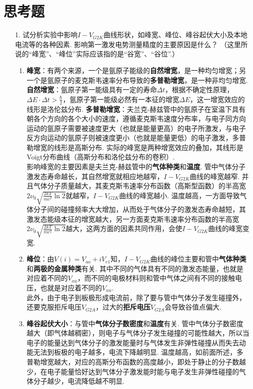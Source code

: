 \documentclass[UTF8,10pt,a4paper]{article}
\begin{document}
\section{思考题}
\begin{enumerate}
    \item[1.] 试分析实验中影响$I-V_{G2K}$曲线形状，如峰宽、峰位、峰谷起伏大小及本地电流等的各种因素. 影响第一激发电势测量精度的主要原因是什么？
    （这里所说的“峰宽”、“峰位”实际应该指的是“谷宽”、“谷位”.）
    \begin{enumerate}
        \item \textbf{峰宽}：有两个来源，一个是氩原子能级的\textbf{自然增宽}，是一种均匀增宽；另一个是氩原子的麦克斯韦速率分布导致的\textbf{多普勒增宽}，是一种非均匀增宽. \textbf{自然增宽}：氩原子第一能级具有一定的寿命$\Delta t$，根据不确定性原理，$\Delta E\cdot\Delta t>\frac{\hbar}{2}$，氩原子第一能级必然有一本征的增宽$\Delta E$，这一增宽效应的线形是洛伦兹分布. \textbf{多普勒增宽}：夫兰克-赫兹管中的氩原子在室温下具有朝各个方向的各个大小的速度，遵循麦克斯韦速度分布率，与电子同方向运动的氩原子需要被速度更大（也就是能量更高）的电子所激发，与电子反方向运动的氩原子则被速度更小（也就是能量更低）的电子激发，多普勒增宽的线形是高斯分布. 实际的峰宽是两种增宽效应的叠加，其线形是Voigt分布曲线（高斯分布和洛伦兹分布的卷积）.\\
        影响峰宽的主要因素是夫兰克-赫兹管中的\textbf{气体种类}和\textbf{温度}. 管中气体分子激发态寿命越长，其自然增宽就相应地越窄，$I-V_{G2K}$曲线的峰宽越窄. 并且气体分子质量越大，其麦克斯韦速率分布函数（高斯型函数）的半高宽$2\nu_0\sqrt{\frac{2kT}{mc^2}\ln 2}$就越窄，$I-V_{G2K}$曲线的峰宽越小. 温度越高，一方面导致气体分子间的碰撞频率大大增加，从而处于气体分子的激发态寿命越短，其激发态能级本征的增宽越大，另一方面麦克斯韦速率分布函数的半高宽$2\nu_0\sqrt{\frac{2kT}{mc^2}\ln 2}$越大，这两方面的因素共同作用，会使$I-V_{G2K}$曲线的峰宽变宽.
        \item \textbf{峰位}：由$V(i)=V_{ao}+iV_{e1}$知，$I-V_{G2K}$曲线的峰位主要和管中\textbf{气体种类}和\textbf{两极的金属种类}有关. 其中不同的气体具有不同的激发态能量，也就是对应着不同的$V_{au}$，而不同的电极材料则和管中气体之间有不同的接触电压，也就是对应着不同的$V_{au}$.\\
        此外，由于电子到板极形成电流前，除了要与管中气体分子发生碰撞外，还要克服拒斥电压$V_{G2A}$，过大的\textbf{拒斥电压}$V_{G2A}$会导致谷值点偏大.
        \item \textbf{峰谷起伏大小}：与管中\textbf{气体分子数密度}和\textbf{温度}有关. 管中气体分子数密度越大（即气体越稠密），则电子与气体分子发生碰撞的可能性越大，所以当电子的能量达到气体分子的激发能量时与气体发生非弹性碰撞从而失去动能无法到板极的电子越多，电流下降越明显. 温度越高，如前面所述，多普勒增宽越大，对应的高斯分布函数的高度越小，即处于静止的分子数越少，在电子能量恰好达到气体分子激发能时能与电子发生非弹性碰撞的气体分子越少，电流降低越不明显.

\end{enumerate}
\end{enumerate}
\end{document}

